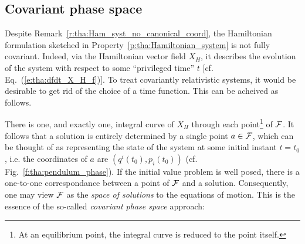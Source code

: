 \subsection{Covariant phase space}

Despite Remark~\ref{r:tha:Ham_syst_no_canonical_coord}, the Hamiltonian formulation sketched in
Property~\ref{p:tha:Hamiltonian_system} is not fully covariant.
Indeed, via the Hamiltonian
vector field $X_H$, it describes the evolution of the system with
respect to some ``privileged time'' $t$ [cf. Eq.~(\ref{e:tha:dfdt_X_H_f})].
To treat covariantly relativistic systems, it would be desirable to get
rid of the choice of a time function. This can be acheived as follows.

There is one, and exactly one,
integral curve of $X_H$ through each point\footnote{At an equilibrium point, the
integral curve is reduced to the point itself.} of $\mathcal{F}$.
It follows that a solution is entirely determined by a single point $a\in\mathcal{F}$,
which can be thought of as representing the state of the system at some initial
instant $t=t_0$, i.e. the coordinates of $a$ are $(q^i(t_0),p_i(t_0))$
(cf. Fig.~\ref{f:tha:pendulum_phase}).
If the initial value problem is well posed, there is a one-to-one
correspondance between a point of $\mathcal{F}$ and a solution.
Consequently, one may view $\mathcal{F}$ as the \emph{space of solutions}
to the equations of motion.
This is the essence of the
so-called \emph{covariant phase space} approach:

